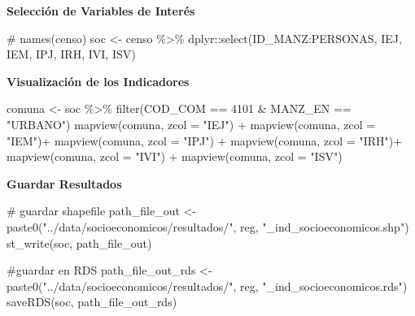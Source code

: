 \documentclass[
  letterpaper,
  DIV=11,
  numbers=noendperiod]{scrreprt}
\newenvironment{Shaded}{\begin{snugshade}}{\end{snugshade}}
\newcommand{\AttributeTok}[1]{\textcolor[rgb]{0.40,0.45,0.13}{#1}}
\newcommand{\CommentTok}[1]{\textcolor[rgb]{0.37,0.37,0.37}{#1}}
\newcommand{\DecValTok}[1]{\textcolor[rgb]{0.68,0.00,0.00}{#1}}
\newcommand{\FunctionTok}[1]{\textcolor[rgb]{0.28,0.35,0.67}{#1}}
\newcommand{\NormalTok}[1]{\textcolor[rgb]{0.00,0.23,0.31}{#1}}
\newcommand{\OtherTok}[1]{\textcolor[rgb]{0.00,0.23,0.31}{#1}}
\newcommand{\SpecialCharTok}[1]{\textcolor[rgb]{0.37,0.37,0.37}{#1}}
\newcommand{\StringTok}[1]{\textcolor[rgb]{0.13,0.47,0.30}{#1}}
\begin{document}
\textbf{Selección de Variables de Interés}

\begin{Shaded}
\begin{Highlighting}[]
\CommentTok{\# names(censo)}
\NormalTok{soc }\OtherTok{\textless{}{-}}\NormalTok{ censo }\SpecialCharTok{\%\textgreater{}\%} 
\NormalTok{  dplyr}\SpecialCharTok{::}\FunctionTok{select}\NormalTok{(ID\_MANZ}\SpecialCharTok{:}\NormalTok{PERSONAS, IEJ, IEM, IPJ, IRH, IVI, ISV)}
\end{Highlighting}
\end{Shaded}

\textbf{Visualización de los Indicadores}

\begin{Shaded}
\begin{Highlighting}[]
\NormalTok{comuna }\OtherTok{\textless{}{-}}\NormalTok{ soc }\SpecialCharTok{\%\textgreater{}\%} \FunctionTok{filter}\NormalTok{(COD\_COM }\SpecialCharTok{==} \DecValTok{4101} \SpecialCharTok{\&}\NormalTok{ MANZ\_EN }\SpecialCharTok{==} \StringTok{"URBANO"}\NormalTok{)}
\FunctionTok{mapview}\NormalTok{(comuna, }\AttributeTok{zcol =} \StringTok{"IEJ"}\NormalTok{) }\SpecialCharTok{+} \FunctionTok{mapview}\NormalTok{(comuna, }\AttributeTok{zcol =} \StringTok{"IEM"}\NormalTok{)}\SpecialCharTok{+}
  \FunctionTok{mapview}\NormalTok{(comuna, }\AttributeTok{zcol =} \StringTok{"IPJ"}\NormalTok{) }\SpecialCharTok{+} \FunctionTok{mapview}\NormalTok{(comuna, }\AttributeTok{zcol =} \StringTok{"IRH"}\NormalTok{)}\SpecialCharTok{+}
  \FunctionTok{mapview}\NormalTok{(comuna, }\AttributeTok{zcol =} \StringTok{"IVI"}\NormalTok{) }\SpecialCharTok{+} \FunctionTok{mapview}\NormalTok{(comuna, }\AttributeTok{zcol =} \StringTok{"ISV"}\NormalTok{)}
\end{Highlighting}
\end{Shaded}

\textbf{Guardar Resultados}

\begin{Shaded}
\begin{Highlighting}[]
\CommentTok{\# guardar shapefile}
\NormalTok{path\_file\_out }\OtherTok{\textless{}{-}} \FunctionTok{paste0}\NormalTok{(}\StringTok{"../data/socioeconomicos/resultados/"}\NormalTok{,}
\NormalTok{                    reg, }\StringTok{"\_ind\_socioeconomicos.shp"}\NormalTok{)}
\FunctionTok{st\_write}\NormalTok{(soc, path\_file\_out)}

\CommentTok{\#guardar en RDS}
\NormalTok{path\_file\_out\_rds }\OtherTok{\textless{}{-}} \FunctionTok{paste0}\NormalTok{(}\StringTok{"../data/socioeconomicos/resultados/"}\NormalTok{,}
\NormalTok{                    reg, }\StringTok{"\_ind\_socioeconomicos.rds"}\NormalTok{)}
\FunctionTok{saveRDS}\NormalTok{(soc, path\_file\_out\_rds)  }
\end{Highlighting}
\end{Shaded}
\end{document}
